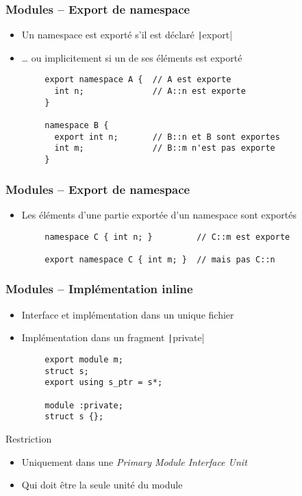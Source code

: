 \documentclass[C++.tex]{subfiles}
\begin{document}
\begin{frame}[fragile]
	\frametitle{Modules -- Export de namespace}
	\begin{itemize}
		\item Un namespace est exporté s'il est déclaré \texttt|export|
		\item \ldots{} ou implicitement si un de ses éléments est exporté
	\end{itemize}

	\begin{verbatim}
		export namespace A {  // A est exporte
		  int n;              // A::n est exporte
		}

		namespace B {
		  export int n;       // B::n et B sont exportes
		  int m;              // B::m n'est pas exporte
		}
	\end{verbatim}
\end{frame}

\begin{frame}[fragile]
	\frametitle{Modules -- Export de namespace}
	\begin{itemize}
		\item Les éléments d'une partie exportée d'un namespace sont exportés
	\end{itemize}

	\begin{verbatim}
		namespace C { int n; }         // C::m est exporte

		export namespace C { int m; }  // mais pas C::n
	\end{verbatim}
\end{frame}

\begin{frame}[fragile]
	\frametitle{Modules -- Implémentation inline}
	\begin{itemize}
		\item Interface et implémentation dans un unique fichier
		\item Implémentation dans un fragment \texttt|private|
	\end{itemize}

	\begin{verbatim}
		export module m;
		struct s;
		export using s_ptr = s*;

		module :private;
		struct s {};
	\end{verbatim}

	\begin{alertblock}{Restriction}
		\begin{itemize}
			\item Uniquement dans une \textit{Primary Module Interface Unit}
			\item Qui doit être la seule unité du module
		\end{itemize}
	\end{alertblock}
\end{frame}
\end{document}
